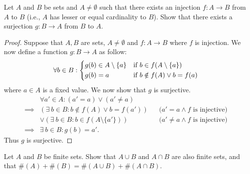 \begin{ex}\label{ex:3.6.8}
  Let \(A\) and \(B\) be sets and \(A \neq \emptyset\) such that there exists an injection \(f : A \to B\) from \(A\) to \(B\) (i.e., \(A\) has lesser or equal cardinality to \(B\)).
  Show that there exists a surjection \(g : B \to A\) from \(B\) to \(A\).
\end{ex}

\begin{proof}
  Suppose that \(A, B\) are sets, \(A \neq \emptyset\) and \(f : A \to B\) where \(f\) is injection.
  We now define a function \(g : B \to A\) as follow:
  \[
    \forall b \in B : \begin{dcases}
      g(b) \in A \setminus \{a\} & \text{if } b \in f(A \setminus \{a\})  \\
      g(b) = a                   & \text{if } b \notin f(A) \lor b = f(a)
    \end{dcases}
  \]
  where \(a \in A\) is a fixed value.
  We now show that \(g\) is surjective.
  \begin{align*}
             & \forall a' \in A : (a' = a) \lor (a' \neq a)                                                           \\
    \implies & (\exists\ b \in B : b \notin f(A) \lor b = f(a'))     &  & \text{(\(a' = a \land f\) is injective)}    \\
             & \lor (\exists\ b \in B : b \in f(A \setminus \{a'\})) &  & \text{(\(a' \neq a \land f\) is injective)} \\
    \implies & \exists\ b \in B : g(b) = a'.
  \end{align*}
  Thus \(g\) is surjective.
\end{proof}

\begin{ex}\label{ex:3.6.9}
  Let \(A\) and \(B\) be finite sets.
  Show that \(A \cup B\) and \(A \cap B\) are also finite sets, and that \(\#(A) + \#(B) = \#(A \cup B) + \#(A \cap B)\).
\end{ex}

